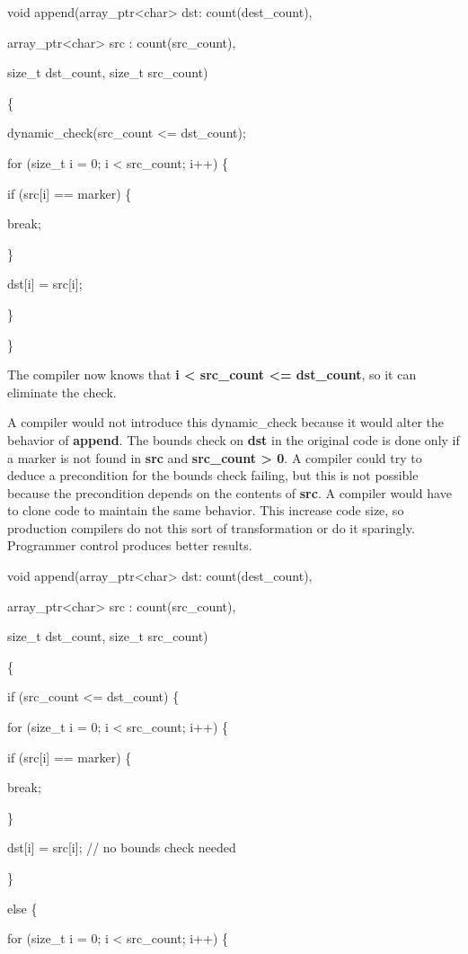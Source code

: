 \documentclass[]{article}
\begin{document}
void append(array\_ptr\textless{}char\textgreater{} dst:
count(dest\_count),

array\_ptr\textless{}char\textgreater{} src : count(src\_count),

size\_t dst\_count, size\_t src\_count)

\{

dynamic\_check(src\_count \textless{}= dst\_count);

for (size\_t i = 0; i \textless{} src\_count; i++) \{

if (src{[}i{]} == marker) \{

break;

\}

dst{[}i{]} = src{[}i{]};

\}

\}

The compiler now knows that \textbf{i \textless{} src\_count
\textless{}= dst\_count}, so it can eliminate the check.

A compiler would not introduce this dynamic\_check because it would
alter the behavior of \textbf{append}. The bounds check on \textbf{dst}
in the original code is done only if a marker is not found in
\textbf{src} and \textbf{src\_count \textgreater{} 0}. A compiler could
try to deduce a precondition for the bounds check failing, but this is
not possible because the precondition depends on the contents of
\textbf{src}. A compiler would have to clone code to maintain the same
behavior. This increase code size, so production compilers do not this
sort of transformation or do it sparingly. Programmer control produces
better results.

void append(array\_ptr\textless{}char\textgreater{} dst:
count(dest\_count),

array\_ptr\textless{}char\textgreater{} src : count(src\_count),

size\_t dst\_count, size\_t src\_count)

\{

if (src\_count \textless{}= dst\_count) \{

for (size\_t i = 0; i \textless{} src\_count; i++) \{

if (src{[}i{]} == marker) \{

break;

\}

dst{[}i{]} = src{[}i{]}; // no bounds check needed

\}

else \{

for (size\_t i = 0; i \textless{} src\_count; i++) \{
\end{document}
